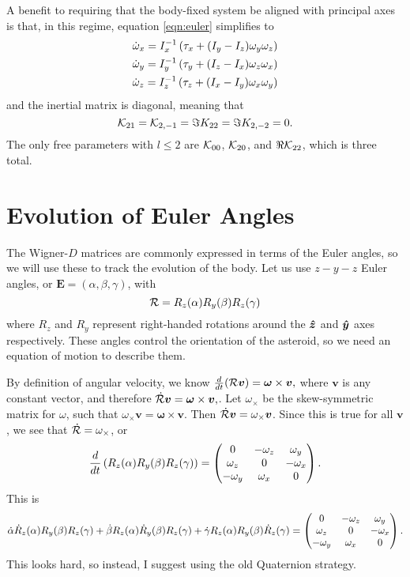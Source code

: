 \documentclass[aps,twocolumn,secnumarabic,balancelastpage,amsmath,amssymb,nofootinbib,floatfix]{revtex4-1}
\begin{document}
A benefit to requiring that the body-fixed system be aligned with principal axes is that, in this regime, equation \ref{eqn:euler} simplifies to
\begin{equation}
\begin{aligned}
\dot \omega_x = I_x^{-1}\left( \tau_x + (I_y - I_z)\omega_y \omega_z \right)\\
\dot \omega_y = I_y^{-1}\left( \tau_y + (I_z - I_x)\omega_z \omega_x \right)\\
\dot \omega_z = I_z^{-1}\left( \tau_z + (I_x - I_y)\omega_x \omega_y \right)\\
\end{aligned}
\end{equation}
and the inertial matrix is diagonal, meaning that
$$\mathcal{K}_{21} = \mathcal{K}_{2,-1}=\Im K_{22} = \Im K_{2,-2}= 0.$$
The only free parameters with $l\leq 2$ are $\mathcal{K}_{00}$, $\mathcal{K}_{20}$, and $\Re \mathcal{K}_{22}$, which is three total.



\section{Evolution of Euler Angles}
The Wigner-$D$ matrices are commonly expressed in terms of the Euler angles, so we will use these to track the evolution of the body. Let us use $z-y-z$ Euler angles, or $\bm E = (\alpha, \beta, \gamma)$, with
\begin{equation}
\mathcal{R} = R_z(\alpha) R_y(\beta) R_z(\gamma)
\label{eqn:euler-angle-rotation}
\end{equation}
where $R_z$ and $R_y$ represent right-handed rotations around the $\bm{\hat z}$ and $\bm{\hat y}$ axes respectively. These angles control the orientation of the asteroid, so we need an equation of motion to describe them.

By definition of angular velocity, we know $\frac{d}{dt}(\mathcal{R} \bm v) = \bm \omega \times \bm v,$ where $\bm v$ is any constant vector, and therefore $\dot {\mathcal{R}} \bm v = \bm \omega \times \bm v,$. Let $\omega_{\times}$ be the skew-symmetric matrix for $\omega$, such that $\omega_{\times} \bm v = \bm\omega \times \bm v$. Then $\dot {\mathcal{R}} \bm v = \omega_\times \bm v$. Since this is true for all $\bm v$, we see that $\dot {\mathcal{R}} = \omega_\times$, or
$$\frac{d}{dt}\left( R_z(\alpha)R_y(\beta)R_z(\gamma) \right) = \left( \begin{matrix}
0 & -\omega_z & \omega_y \\
\omega_z & 0 & -\omega_x \\
-\omega_y & \omega_x & 0
 \end{matrix} \right).$$
 This is
 $$\dot \alpha \dot R_z(\alpha)R_y(\beta)R_z(\gamma) + \dot \beta R_z(\alpha)\dot R_y(\beta)R_z(\gamma) + \dot \gamma R_z(\alpha)R_y(\beta)\dot R_z(\gamma) = \left( \begin{matrix}
 0 & -\omega_z & \omega_y \\
 \omega_z & 0 & -\omega_x \\
 -\omega_y & \omega_x & 0
  \end{matrix} \right).$$
  This looks hard, so instead, I suggest using the old Quaternion strategy.
\end{document}
